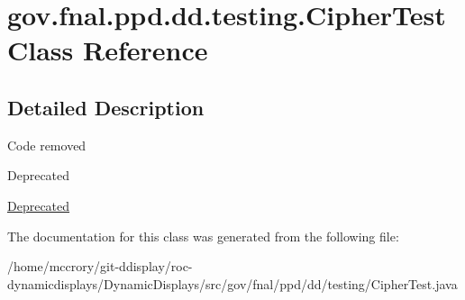 \hypertarget{classgov_1_1fnal_1_1ppd_1_1dd_1_1testing_1_1CipherTest}{\section{gov.\-fnal.\-ppd.\-dd.\-testing.\-Cipher\-Test Class Reference}
\label{classgov_1_1fnal_1_1ppd_1_1dd_1_1testing_1_1CipherTest}
}


\subsection{Detailed Description}
Code removed \begin{DoxyRefDesc}{Deprecated}
\item[\hyperlink{deprecated__deprecated000004}{Deprecated}]\end{DoxyRefDesc}


The documentation for this class was generated from the following file\-:\begin{DoxyCompactItemize}
\item 
/home/mccrory/git-\/ddisplay/roc-\/dynamicdisplays/\-Dynamic\-Displays/src/gov/fnal/ppd/dd/testing/Cipher\-Test.\-java\end{DoxyCompactItemize}
